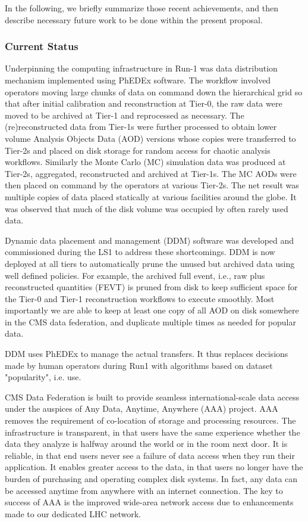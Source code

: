 \documentclass[11pt,a4paper]{article}
\begin{document}
In the following, we briefly summarize those recent achievements, and then describe necessary future 
work to be done within the present proposal.

\subsubsection{Current Status}


Underpinning the computing infrastructure in Run-1 was data
distribution mechanism implemented using PhEDEx software. The workflow
involved operators moving large chunks of data on command down the
hierarchical grid so that after initial calibration and reconstruction
at Tier-0, the raw data were moved to be archived at Tier-1 and
reprocessed as necessary. The (re)reconstructed data from Tier-1s were
further processed to obtain lower volume Analysis Objects Data (AOD)
versions whose copies were transferred to Tier-2s and placed on disk
storage for random access for chaotic analysis workflows.  Similarly
the Monte Carlo (MC) simulation data was produced at Tier-2s,
aggregated, reconstructed and archived at Tier-1s. The MC AODs were
then placed on command by the operators at various Tier-2s. The net
result was multiple copies of data placed statically at various
facilities around the globe. It was observed that much of the disk
volume was occupied by often rarely used data.

Dynamic data placement and management (DDM) software was developed and
commissioned during the LS1 to address these shortcomings. DDM is now
deployed at all tiers to automatically prune the unused but archived
data using well defined policies.  For example, the archived full
event, i.e., raw plus reconstructed quantities (FEVT) is pruned from
disk to keep sufficient space for the Tier-0 and Tier-1 reconstruction
workflows to execute smoothly. Most importantly we are able to keep at
least one copy of all AOD on disk somewhere in the CMS data
federation, and duplicate multiple times as needed for popular data.

DDM uses PhEDEx to manage the actual transfers. It thus replaces decisions made by human operators during 
Run1 with algorithms based on dataset "popularity", i.e. use.


CMS Data Federation is built to provide seamless international-scale data
access  under the auspices of Any Data, Anytime, Anywhere
(AAA) project. AAA removes the requirement of co-location of storage and
processing resources.  The infrastructure is transparent, in that
users have the same experience whether the data they analyze is
halfway around the world or in the room next door.  It is reliable, in
that end users never see a failure of data access when they run their
application.  It enables greater access to the data, in that users no
longer have the burden of purchasing and operating complex disk
systems. In fact, any data can be accessed anytime from anywhere with
an internet connection. The key to success of AAA is the improved
wide-area network access due to enhancements made to our dedicated LHC
network.
\end{document}
